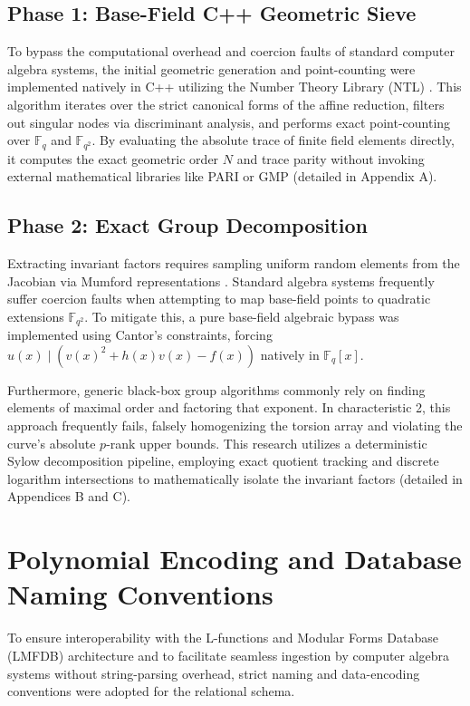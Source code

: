 \documentclass[letterpaper, 11pt]{article}
\begin{document}
\subsection{Phase 1: Base-Field C++ Geometric Sieve}
To bypass the computational overhead and coercion faults of standard computer algebra systems, the initial geometric generation and point-counting were implemented natively in C++ utilizing the Number Theory Library (NTL) \cite{ShoupNTL}. This algorithm iterates over the strict canonical forms of the affine reduction, filters out singular nodes via discriminant analysis, and performs exact point-counting over $\mathbb{F}_q$ and $\mathbb{F}_{q^2}$. By evaluating the absolute trace of finite field elements directly, it computes the exact geometric order $N$ and trace parity without invoking external mathematical libraries like PARI or GMP (detailed in Appendix A).

\subsection{Phase 2: Exact Group Decomposition}
Extracting invariant factors requires sampling uniform random elements from the Jacobian via Mumford representations \cite{Cantor1987}. Standard algebra systems frequently suffer coercion faults when attempting to map base-field points to quadratic extensions $\mathbb{F}_{q^2}$. To mitigate this, a pure base-field algebraic bypass was implemented using Cantor's constraints, forcing $u(x) \mid \left( v(x)^2 + h(x)v(x) - f(x) \right)$ natively in $\mathbb{F}_q[x]$.

Furthermore, generic black-box group algorithms commonly rely on finding elements of maximal order and factoring that exponent. In characteristic 2, this approach frequently fails, falsely homogenizing the torsion array and violating the curve's absolute $p$-rank upper bounds. This research utilizes a deterministic Sylow decomposition pipeline, employing exact quotient tracking and discrete logarithm intersections to mathematically isolate the invariant factors (detailed in Appendices B and C).

\section{Polynomial Encoding and Database Naming Conventions}
To ensure interoperability with the L-functions and Modular Forms Database (LMFDB) architecture and to facilitate seamless ingestion by computer algebra systems without string-parsing overhead, strict naming and data-encoding conventions were adopted for the relational schema.
\end{document}

